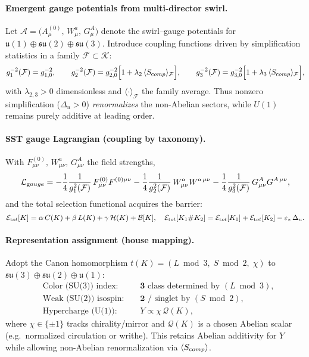 \documentclass[11pt]{article}
\begin{document}
\paragraph{Emergent gauge potentials from multi-director swirl.}
    Let \(\mathcal A=\big(A_\mu^{(0)},\,W_\mu^a,\,G_\mu^A\big)\) denote the swirl–gauge potentials for
    \(\mathfrak u(1)\oplus\mathfrak{su}(2)\oplus\mathfrak{su}(3)\).
    Introduce coupling functions driven by simplification statistics in a family \(\mathcal F\subset\mathcal K\):
    \[
        g_1^{-2}(\mathcal F)=g_{1,0}^{-2},\qquad
        g_2^{-2}(\mathcal F)=g_{2,0}^{-2}\Bigl[1+\lambda_2\,\langle S_{\textrm comp}\rangle_{\mathcal F}\Bigr],
        \qquad
        g_3^{-2}(\mathcal F)=g_{3,0}^{-2}\Bigl[1+\lambda_3\,\langle S_{\textrm comp}\rangle_{\mathcal F}\Bigr],
    \]
    with \(\lambda_{2,3}>0\) dimensionless and \(\langle\cdot\rangle_{\mathcal F}\) the family average.
    Thus nonzero simplification (\(\Delta_u>0\)) \emph{renormalizes} the non-Abelian sectors, while \(U(1)\) remains purely additive at leading order.

\paragraph{SST gauge Lagrangian (coupling by taxonomy).}
    With \(F_{\mu\nu}^{(0)},\,W_{\mu\nu}^a,\,G_{\mu\nu}^A\) the field strengths,
    \[
        \mathcal L_{\textrm gauge}
        =-\frac{1}{4}\frac{1}{g_1^2(\mathcal F)}\,F_{\mu\nu}^{(0)}F^{(0)\mu\nu}
        -\frac{1}{4}\frac{1}{g_2^2(\mathcal F)}\,W_{\mu\nu}^{a}W^{a\,\mu\nu}
        -\frac{1}{4}\frac{1}{g_3^2(\mathcal F)}\,G_{\mu\nu}^{A}G^{A\,\mu\nu},
    \]
    and the total selection functional acquires the barrier:
    \[
        \mathcal E_{\textrm tot}[K]=\alpha\,C(K)+\beta\,L(K)+\gamma\,\mathcal H(K)+\mathcal B[K],
        \quad
        \mathcal E_{\textrm tot}[K_1\#K_2]
        =\mathcal E_{\textrm tot}[K_1]+\mathcal E_{\textrm tot}[K_2]-\varepsilon_*\,\Delta_u.
    \]

\paragraph{Representation assignment (house mapping).}
    Adopt the Canon homomorphism \(t(K)=(L \bmod 3,\;S \bmod 2,\;\chi)\) to \(\mathfrak{su}(3)\oplus\mathfrak{su}(2)\oplus\mathfrak u(1)\):
    \[
        \begin{aligned}
        &\text{Color (SU(3)) index: } &&\mathbf 3 \text{ class determined by } (L \bmod 3),\\
        &\text{Weak (SU(2)) isospin: } &&\mathbf 2 \text{ / singlet by } (S \bmod 2),\\
        &\text{Hypercharge (U(1)): } &&Y\propto \chi\, \mathcal Q(K),
        \end{aligned}
    \]
    where \(\chi\in\{\pm1\}\) tracks chirality/mirror and \(\mathcal Q(K)\) is a chosen Abelian scalar (e.g.\ normalized circulation or writhe). This retains Abelian additivity for \(Y\) while allowing non-Abelian renormalization via \(\langle S_{\textrm comp}\rangle\).
\end{document}
